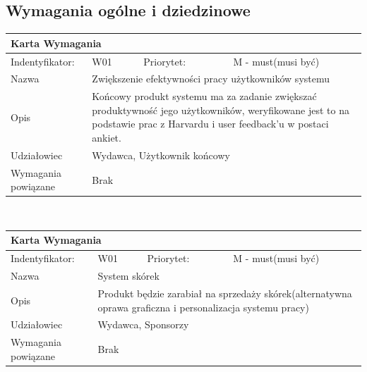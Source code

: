 \documentclass[a4paper,11pt]{report}
\begin{document}
\subsection {Wymagania ogólne i dziedzinowe}
		\begin{tabular}{|p{3cm}|p{2cm}|p{2cm}|p{6cm}|}
		\hline
		\multicolumn{4}{|p{12 cm}|}{Karta Wymagania}\\
		\hline
		Indentyfikator: & W01 & Priorytet: & M - must(musi być)\\
		\hline
		Nazwa & \multicolumn{3}{|p{10 cm}|}{Zwiększenie efektywności pracy użytkowników systemu}\\
		\hline
		Opis & \multicolumn{3}{|p{10 cm}|}{Końcowy produkt systemu ma za zadanie zwiększać produktywność jego użytkowników, weryfikowane jest to na podstawie prac z Harvardu i user feedback’u w postaci ankiet. }\\
		\hline
		Udziałowiec & \multicolumn{3}{|p{10 cm}|}{Wydawca, Użytkownik końcowy}\\
		\hline
		Wymagania powiązane & \multicolumn{3}{|p{10 cm}|}{Brak}\\
		\hline
		\end{tabular}\\
		\begin{tabular}{|p{3cm}|p{2cm}|p{2cm}|p{6cm}|}
		\hline
		\multicolumn{4}{|p{12 cm}|}{Karta Wymagania}\\
		\hline
		Indentyfikator: & W01 & Priorytet: & M - must(musi być)\\
		\hline
		Nazwa & \multicolumn{3}{|p{10 cm}|}{System skórek}\\
		\hline
		Opis & \multicolumn{3}{|p{10 cm}|}{Produkt będzie zarabiał na sprzedaży skórek(alternatywna oprawa graficzna i personalizacja systemu pracy)}\\
		\hline
		Udziałowiec & \multicolumn{3}{|p{10 cm}|}{Wydawca, Sponsorzy}\\
		\hline
		Wymagania powiązane & \multicolumn{3}{|p{10 cm}|}{Brak}\\
		\hline
		\end{tabular}\\
\end{document}
